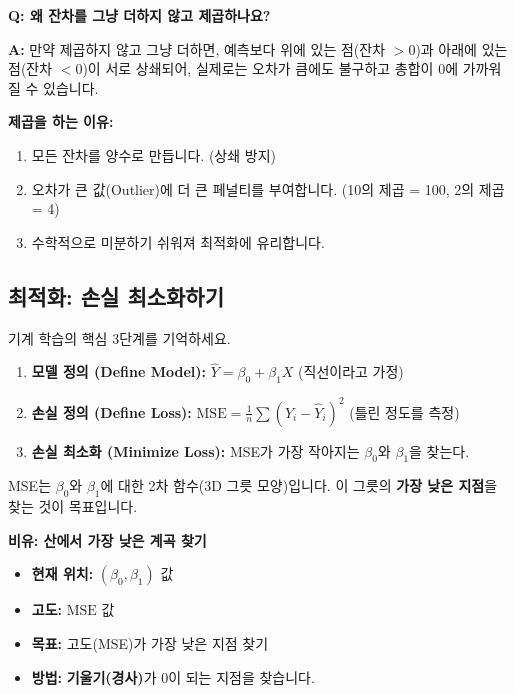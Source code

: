 \documentclass[11pt,a4paper]{book}
\theoremstyle{definition}
\begin{document}
\begin{warningbox}
\textbf{Q: 왜 잔차를 그냥 더하지 않고 제곱하나요?}

\textbf{A:} 만약 제곱하지 않고 그냥 더하면, 예측보다 위에 있는 점(잔차 $> 0$)과 아래에 있는 점(잔차 $< 0$)이 서로 상쇄되어, 실제로는 오차가 큼에도 불구하고 총합이 0에 가까워질 수 있습니다.

\textbf{제곱을 하는 이유:}
\begin{enumerate}
    \item 모든 잔차를 양수로 만듭니다. (상쇄 방지)
    \item 오차가 큰 값(Outlier)에 더 큰 페널티를 부여합니다. (10의 제곱 = 100, 2의 제곱 = 4)
    \item 수학적으로 미분하기 쉬워져 최적화에 유리합니다.
\end{enumerate}
\end{warningbox}

\subsection{최적화: 손실 최소화하기}

기계 학습의 핵심 3단계를 기억하세요.

\begin{tcolorbox}[title={기계 학습의 핵심 3단계 프로세스}]
    \begin{enumerate}
        \item \textbf{모델 정의 (Define Model):} $ \hat{Y} = \beta_0 + \beta_1 X $ (직선이라고 가정)
        \item \textbf{손실 정의 (Define Loss):} $ \text{MSE} = \frac{1}{n} \sum (Y_i - \hat{Y}_i)^2 $ (틀린 정도를 측정)
        \item \textbf{손실 최소화 (Minimize Loss):} MSE가 가장 작아지는 $\beta_0$와 $\beta_1$을 찾는다.
    \end{enumerate}
\end{tcolorbox}

MSE는 $\beta_0$와 $\beta_1$에 대한 2차 함수(3D 그릇 모양)입니다. 이 그릇의 \textbf{가장 낮은 지점}을 찾는 것이 목표입니다.

\begin{examplebox}
\textbf{비유: 산에서 가장 낮은 계곡 찾기}
\begin{itemize}
    \item \textbf{현재 위치:} $(\beta_0, \beta_1)$ 값
    \item \textbf{고도:} $\text{MSE}$ 값
    \item \textbf{목표:} 고도(MSE)가 가장 낮은 지점 찾기
    \item \textbf{방법:} \textbf{기울기(경사)}가 0이 되는 지점을 찾습니다.
\end{itemize}
\end{examplebox}
\end{document}
